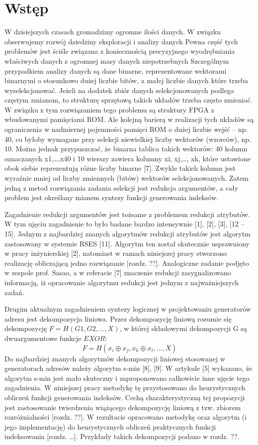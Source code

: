 \chapter{Wstęp}

W dzisiejszych czasach gromadzimy ogromne ilości danych.
W związku obserwujemy rozwój dziedziny eksploracji i analizy danych
Pewna część tych problemów jest ściśle związana z koniecznością precyzyjnego wyodrębniania właściwych danych z ogromnej masy danych niepotrzebnych
Szczególnym przypadkiem analizy danych są dane binarne, reprezentowane wektorami binarnymi o stosunkowo dużej liczbie bitów,
a małej liczbie danych które trzeba wyselekcjonować.
Jeżeli na dodatek zbiór danych selekcjonowanych podlega częstym zmianom,
to strukturę sprzętową takich układów trzeba często zmieniać.
W związku z tym rozwiązaniem tego problemu są struktury FPGA z wbudowanymi pamięciami ROM.
Ale kolejną barierą w realizacji tych układów są ograniczenia w nadmiernej pojemności pamięci ROM o dużej liczbie wejść – np. 40,
co byłoby wymagane przy selekcji niewielkiej liczby wektorów (wzorców), np. 10.
Można jednak przypuszczać, że binarna tablica takich wektorów: 40 kolumn oznaczanych x1,…,x40 i 10 wierszy zawiera kolumny xi, xj,…, xk,
które ustawione obok siebie reprezentują różne liczby binarne [7].
Zwykle takich kolumn jest wyraźnie mniej od liczby zmiennych (bitów) wektorów selekcjonowanych.
Zatem jedną z metod rozwiązania zadania selekcji jest redukcja argumentów,
a cały problem jest określany mianem syntezy funkcji generowania indeksów.

Zagadnienie redukcji argumentów jest tożsame z problemem redukcji atrybutów.
W tym ujęciu zagadnienie to było badane bardzo intensywnie [1], [2], [3], [12 – 15].
Jednym z najbardziej znanych algorytmów redukcji atrybutów jest algorytm zastosowany w systemie RSES [11].
Algorytm ten został skutecznie usprawniony w pracy inżynierskiej [2],
natomiast w ramach niniejszej pracy stworzono realizację obliczającą jedno rozwiązanie [rozdz. ??].
Analogiczne zadanie podjęto w zespole prof. Sasao,
a w referacie [7] znaczenie redukcji zasygnalizowano informacją,
iż opracowanie algorytmu redukcji jest jednym z najważniejszych zadań.

Drugim aktualnym zagadnieniem syntezy logicznej w projektowaniu generatorów adresu jest dekompozycja liniowa.
Przez dekompozycję liniową rozumie się dekompozycję $F = H(G1, G2, ...,  X)$,
w której składowymi dekompozycji G są dwuargumentowe funkcje $EXOR$:
\begin{equation}
F = H (x_i \oplus x_j, x_k \oplus x_l, ..., X)
\end{equation}
Do najbardziej znanych algorytmów dekompozycji liniowej stosowanej w generatorach adresów należy algorytm s-min [8], [9].
W artykule [5] wykazano, że algorytm s-min jest mało skuteczny i zaproponowano całkowicie inne ujęcie tego zagadnienia.
W niniejszej pracy metodykę tę przystosowano do heurystycznych obliczeń funkcji generowania indeksów.
Cechą charakterystyczną tej propozycji jest zastosowanie twierdzenia wiążącego dekompozycję liniową z tzw. zbiorem rozróżnialności [rozdz. ??].
W rezultacie opracowano metodykę oraz algorytm (i jego implementację) do heurystycznych obliczeń praktycznych funkcji indeksowania [rozdz. …].
Przykłady takich dekompozycji podano w rozdz. ??.

